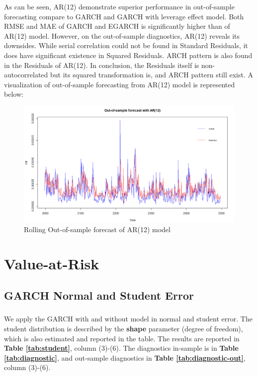 \documentclass[a4paper]{article}
\begin{document}
As can be seen, AR(12) demonstrate superior performance in out-of-sample forecasting compare to GARCH and GARCH with leverage effect model. Both RMSE and MAE of GARCH and EGARCH is significantly higher than of AR(12) model. However, on the out-of-sample diagnostics, AR(12) reveals its downsides. While serial correlation could not be found in Standard Residuals, it does have significant existence in Squared Residuals. ARCH pattern is also found in the Residuals of AR(12). In conclusion, the Residuals itself is non-autocorrelated but its squared transformation is, and ARCH pattern still exist. 
A visualization of out-of-sample forecasting from AR(12) model is represented below:

\begin{figure}[H]
\centering
\includegraphics[width=1.05\textwidth]{AR12.png}
\caption{\label{fig:ar12}Rolling Out-of-sample forecast of AR(12) model}
\end{figure}




\section{Value-at-Risk}

\subsection{GARCH Normal and Student Error}

\subparagraph*{}
We apply the GARCH with and without model in normal and student error. The student distribution is described by the \textbf{shape} parameter (degree of freedom), which is also estimated and reported in the table. The results are reported in \textbf{Table \ref{tab:student}}, column (3)-(6). 
The diagnostics in-sample is in \textbf{Table \ref{tab:diagnostic}}, and out-sample diagnostics in \textbf{Table \ref{tab:diagnostic-out}}, column (3)-(6). \\
\end{document}
